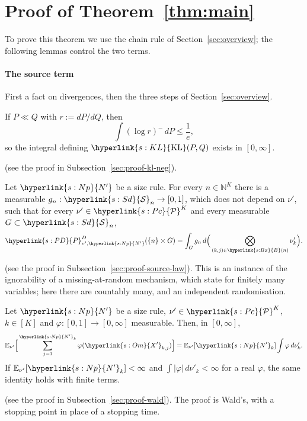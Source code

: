 \documentclass[11pt]{article}
\newcommand{\sy}[2]{\hyperlink{#1}{#2}}
\newcommand{\E}{\mathbb{E}}
\newcommand{\KL}{\sy{s:KL}{\mathrm{KL}}}
\newcommand{\N}{\mathbb{N}}
\newcommand{\Pc}{\sy{s:Pc}{\mathcal{P}}}
\newcommand{\Sd}{\sy{s:Sd}{\mathcal{S}}}
\newcommand{\Bx}{\sy{s:Bx}{B}}
\newcommand{\Np}{\sy{s:Np}{N'}}
\newcommand{\PD}{\sy{s:PD}{P}^{D}}
\newcommand{\Xp}{\sy{s:Om}{X'}}
\begin{document}
\section{Proof of Theorem~\ref{thm:main}}\label{sec:proofs}

To prove this theorem we use the chain rule of Section~\ref{sec:overview}; the following lemmas
control the two terms.

\paragraph{The source term} First a fact on divergences, then the three steps of
Section~\ref{sec:overview}.

\begin{lemma}\label{lem:kl-neg}
If $P\ll Q$ with $r:=dP/dQ$, then
\begin{equation*}
\int(\log r)^-\,dP\le\frac1e,
\end{equation*}
so the integral defining $\KL(P,Q)$ exists in $[0,\infty]$.
\end{lemma}
(see the proof in Subsection~\ref{sec:proof-kl-neg}).

\begin{lemma}\label{lem:source-law}
Let $\Np$ be a size rule. For every $n\in\N^K$ there is a measurable $g_n:\Sd_n\to[0,1]$, which does
not depend on $\nu'$, such that for every $\nu'\in\Pc^K$ and every measurable $G\subset\Sd_n$,
\[
\PD_{\nu',\Np}(\{n\}\times G)=\int_Gg_n\,d\Big(\bigotimes_{(k,j)\in\Bx(n)}\nu'_k\Big).
\]
\end{lemma}
(see the proof in Subsection~\ref{sec:proof-source-law}). This is an instance of the
ignorability of a missing-at-random mechanism, which \citet[Theorem~1]{FDS18} state for finitely
many variables; here there are countably many, and an independent randomisation.

\begin{lemma}\label{lem:wald}
Let $\Np$ be a size rule, $\nu'\in\Pc^K$, $k\in[K]$ and $\varphi:[0,1]\to[0,\infty]$ measurable.
Then, in $[0,\infty]$,
\begin{equation*}
\E_{\nu'}\Big[\sum_{j=1}^{\Np_k}\varphi(\Xp_{k,j})\Big]=\E_{\nu'}[\Np_k]\int\varphi\,d\nu'_k.
\end{equation*}
If $\E_{\nu'}[\Np_k]<\infty$ and $\int|\varphi|\,d\nu'_k<\infty$ for a real $\varphi$, the same
identity holds with finite terms.
\end{lemma}
(see the proof in Subsection~\ref{sec:proof-wald}). The proof is Wald's, with a stopping point in
place of a stopping time.
\end{document}
